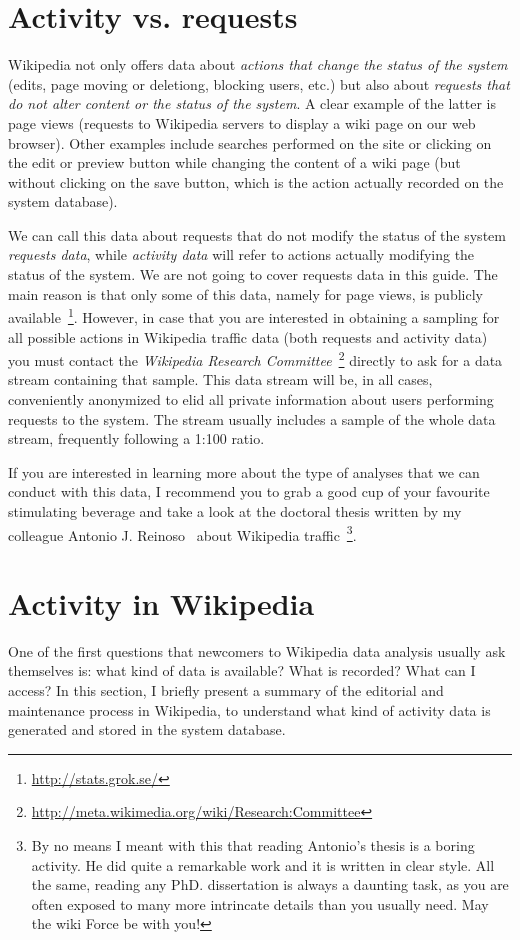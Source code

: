 \section{Activity vs. requests}
Wikipedia not only offers data about \textit{actions
that change the status of the system} (edits, page moving or deletiong, blocking users,
etc.) but also about \textit{requests that do not alter content or the status of the system}.
A clear example of the latter is page views (requests to Wikipedia servers to display
a wiki page on our web browser). Other examples include searches performed on the site or
clicking on the edit or preview button while changing the content of a wiki page
(but without clicking on the save button, which is the action actually recorded on
the system database).

We can call this data about requests that do not modify the status of the system 
\textit{requests data}, while \textit{activity data} will refer to actions actually
modifying the status of the system. We are not going to cover requests data in this
guide. The main reason is that only some of this data, namely for page views, is
publicly available~\footnote{\url{http://stats.grok.se/}}. However, in case that
you are interested in obtaining a sampling for all possible actions in Wikipedia
traffic data (both requests and activity data) you must contact the 
\textit{Wikipedia Research Committee}~\footnote{\url{http://meta.wikimedia.org/wiki/Research:Committee}} 
directly to ask for a data stream containing that sample. This data stream will be,
in all cases, conveniently anonymized to elid all private information about users
performing requests to the system. The stream usually includes a sample of the
whole data stream, frequently following a 1:100 ratio.

If you are interested in learning more about the type of analyses that
we can conduct with this data, I recommend you to grab a good cup of your favourite
stimulating beverage and take a look at the doctoral thesis written by my colleague
Antonio J. Reinoso~\cite{reinoso2011} about Wikipedia traffic~\footnote{By no means
I meant with this that reading Antonio's thesis is a boring activity. He did quite
a remarkable work and it is written in clear style. All the same, reading any PhD.
dissertation is always a daunting task, as you are often exposed to many more
intrincate details than you usually need. May the wiki Force be with
you!}.

\section{Activity in Wikipedia}
One of the first questions that newcomers to Wikipedia data analysis usually ask
themselves is: what kind of data is available? What is recorded? What can I
access? In this section, I briefly present a summary of the editorial and maintenance
process in Wikipedia, to understand what kind of activity data is generated and
stored in the system database.

